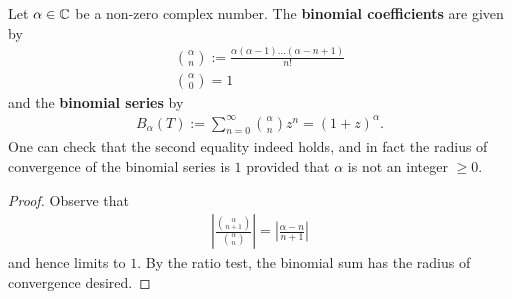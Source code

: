 \documentclass{memoir}
\begin{document}
\begin{exmp}
	Let \(\alpha  \in \mathbb{C}\) be a non-zero complex number. The \textbf{binomial coefficients} are given by
	\begin{align*}
	{\alpha\choose{n}} := \frac{\alpha (\alpha-1)\ldots(\alpha -n+1)}{n!}\\
	{\alpha \choose{0}}=1
	\end{align*}
	and the \textbf{binomial series} by
	\begin{align*}
		B_\alpha (T) := \sum_{n=0}^{\infty} {\alpha \choose{n}}z^{n} = (1+z)^{\alpha }.
	\end{align*}
	One can check that the second equality indeed holds, and in fact the radius of convergence of the binomial series is \(1\) provided that \(\alpha \) is not an integer \(\geq 0\).
\end{exmp}
\begin{proof}
	Observe that
	\begin{align*}
		\left| \frac{ {\alpha \choose{n+1}}}{ {\alpha \choose{n}}} \right| = \left| \frac{\alpha -n}{n+1} \right| 
	\end{align*}
	and hence limits to \(1\). By the ratio test, the binomial sum has the radius of convergence desired.
\end{proof}
\end{document}
